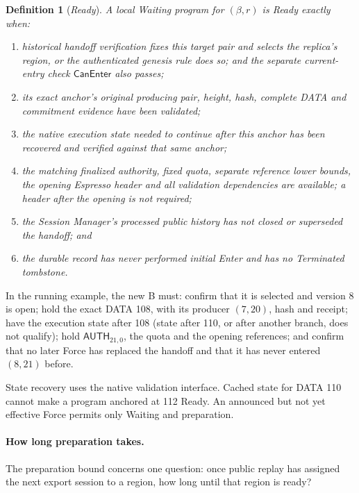 \documentclass[11pt,a4paper]{article}
\newcommand{\tagg}[1]{\ensuremath{\mathsf{#1}}}
\newcommand{\defterm}[1]{\textcolor{rrBlue}{\textit{#1}}}
\newtheorem{definition}{Definition}[section]
\begin{document}
\begin{definition}[\defterm{Ready}]
\label{def:ready}
A local Waiting program for $(\beta,r)$ is Ready exactly when:
\begin{enumerate}[label=(\roman*)]
\item historical handoff verification fixes this target pair and selects
the replica's region, or the authenticated genesis rule does so; and
the separate current-entry check $\tagg{CanEnter}$ also passes;
\item its exact anchor's original producing pair, height, hash, complete
DATA and commitment evidence have been validated;
\item the native execution state needed to continue after this anchor
has been recovered and verified against that same anchor;
\item the matching finalized authority, fixed quota, separate reference
lower bounds, the opening Espresso header and all validation
dependencies are available; a header after the opening is not required;
\item the Session Manager's processed public history has not closed or
superseded the handoff; and
\item the durable record has never performed initial Enter and has no
Terminated tombstone.
\end{enumerate}
\end{definition}
In the running example, the new B must: confirm that it is selected and
version 8 is open; hold the exact DATA 108, with its producer $(7,20)$,
hash and receipt; have the execution state after 108 (state after 110, or
after another branch, does not qualify); hold $\tagg{AUTH}_{21,0}$, the
quota and the opening references; and confirm that no later Force has
replaced the handoff and that it has never entered $(8,21)$ before.

State recovery uses the native validation interface. Cached state for
DATA 110 cannot make a program anchored at 112 Ready. An announced but
not yet effective Force permits only Waiting and preparation.

\paragraph{How long preparation takes.}
The preparation bound concerns one question: once public replay has
assigned the next export session to a region, how long until that region
is ready?
\end{document}

